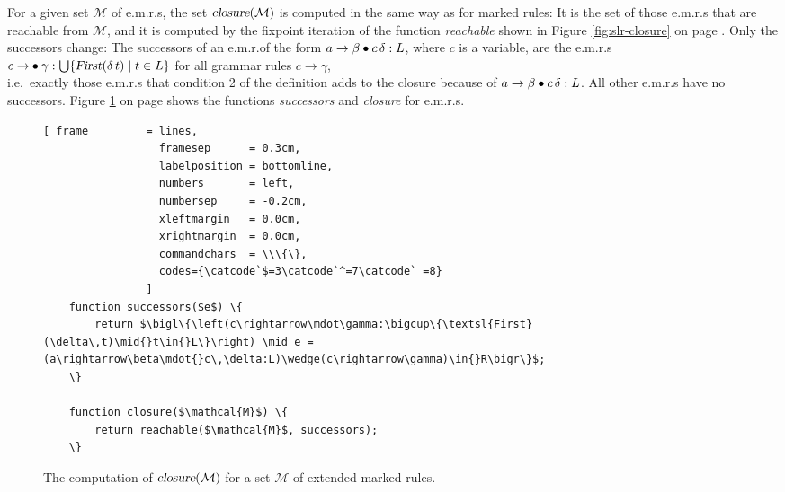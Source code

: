 For a given set $\mathcal{M}$ of e.m.r.s, the set $\textsl{closure}(\mathcal{M})$ is computed in the same way as
for marked rules:  It is the set of those e.m.r.s that are reachable from $\mathcal{M}$, and it is computed by the
fixpoint iteration of the function \textsl{reachable} shown in Figure \ref{fig:slr-closure} on page
\pageref{fig:slr-closure}.  Only the successors change:  The successors of an e.m.r.\@ of the form
$a \rightarrow \beta \mdot c\, \delta: L$, where $c$ is a variable, are the e.m.r.s
\\[0.2cm]
\hspace*{1.3cm}
$c \rightarrow \mdot \gamma: \bigcup \{ \textsl{First}(\delta\, t) \mid t \in L \}$ \quad for all grammar rules
\quad $c \rightarrow \gamma$,
\\[0.2cm]
i.e.~exactly those e.m.r.s that condition 2 of the definition adds to the closure because of
$a \rightarrow \beta \mdot c\, \delta: L$.  All other e.m.r.s have no successors.  Figure \ref{fig:lr-closure} on
page \pageref{fig:lr-closure} shows the functions \textsl{successors} and \textsl{closure} for e.m.r.s.

\begin{figure}[!ht]
  \centering

\begin{Verbatim}[ frame         = lines,
                  framesep      = 0.3cm,
                  labelposition = bottomline,
                  numbers       = left,
                  numbersep     = -0.2cm,
                  xleftmargin   = 0.0cm,
                  xrightmargin  = 0.0cm,
                  commandchars  = \\\{\},
                  codes={\catcode`$=3\catcode`^=7\catcode`_=8}
                ]
    function successors($e$) \{
        return $\bigl\{\left(c\rightarrow\mdot\gamma:\bigcup\{\textsl{First}(\delta\,t)\mid{}t\in{}L\}\right) \mid e = (a\rightarrow\beta\mdot{}c\,\delta:L)\wedge(c\rightarrow\gamma)\in{}R\bigr\}$;
    \}

    function closure($\mathcal{M}$) \{
        return reachable($\mathcal{M}$, successors);
    \}
\end{Verbatim}
\vspace*{-0.3cm}
\caption{The computation of $\textsl{closure}(\mathcal{M})$ for a set $\mathcal{M}$ of extended marked rules.}
\label{fig:lr-closure}
\end{figure}

